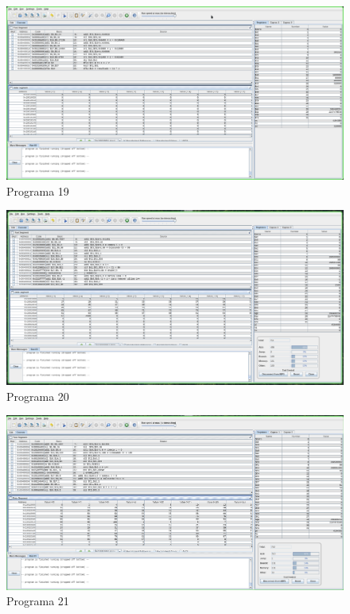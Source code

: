 \documentclass[a4paper,11pt,fleqn]{article}
\begin{document}
\begin{figure}[!ht]
    \caption{Programa 19}
    \centering
    \includegraphics[width=1\textwidth]{programa19}
\end{figure}

\begin{figure}[!ht]
    \caption{Programa 20}
    \centering
    \includegraphics[width=1\textwidth]{programa20}
\end{figure}

\begin{figure}[!ht]
    \caption{Programa 21}
    \centering
    \includegraphics[width=1\textwidth]{programa21}
\end{figure}
\end{document}
